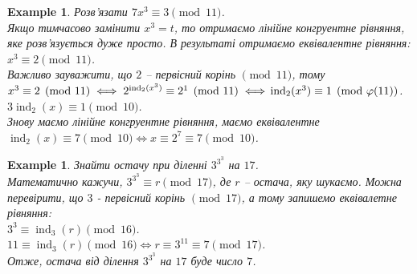 \documentclass[a4paper, 14pt]{extarticle}
\theoremstyle{theoremdd}
\theoremstyle{theoremdd}
\theoremstyle{theoremdd}
\theoremstyle{theoremdd}
\newtheorem{example}[theorem]{Example}
\theoremstyle{theoremdd}
\theoremstyle{theoremdd}
\newtheorem{remark}[theorem]{Remark}
\theoremstyle{theoremdd}
\theoremstyle{theoremdd}
\def\rightproof{$\boxed{\Rightarrow}$ }
\DeclareMathOperator{\ord}{ord}
\DeclareMathOperator{\ind}{ind}
\begin{document}
\iffalse
\begin{remark}
Окремо поясню, що $\ord_{2^{n}} (5) = 2^{n-2} \iff \begin{cases} 2^n \mid 5^{2^{n-2}}-1 \\ 2^{n+1} \nmid 5^{2^{n-2}} - 1 \end{cases}$, бо щось довго з цим мучався.\\
\rightproof Дано: $\ord_{2^n}(5) = 2^{n-2}$, тобто $5^{2^{n-2}} \equiv 1 \pmod {2^n}$. Тоді очевидно маємо перший рядок системи.\\
!Нехай $2^{n+1} \mid 5^{2^{n-2}}-1$, тоді звідси $5^{2^{n-2}} \equiv 1 \pmod {2^{n+1}}$. Тоді звідси $\ord_{2^{n+1}}(5) \mid 2^{n-2}$.\\
Водночас $5^{\ord_{2^{n+1}}(5)} \equiv 1 \pmod {2^n}$, тож звідси $2^{n-2} \mid \ord_{2^{n+1}}(5)$, тобто \\ $\ord_{2^{n+1}}(5) = 2^{n-2}$.
\end{remark}
\fi

\begin{example}
Розв'язати $7x^3 \equiv 3 \pmod {11}$.\\
Якщо тимчасово замінити $x^3 = t$, то отримаємо лінійне конгруентне рівняння, яке розв'язується дуже просто. В результаті отримаємо еквівалентне рівняння:\\
$x^3 \equiv 2 \pmod {11}$.\\
Важливо зауважити, що $2$ -- первісний корінь $\pmod {11}$, тому\\
$x^3 \equiv 2 \pmod {11} \iff 2^{\ind_2 (x^3)} \equiv 2^1 \pmod {11} \iff \\
\ind_2 (x^3) \equiv 1 \pmod {\varphi(11)}$.\\
$3 \ind_2 (x) \equiv 1 \pmod {10}$.\\
Знову маємо лінійне конгруентне рівняння, маємо еквівалентне\\
$\ind_2 (x) \equiv 7 \pmod {10} \iff x \equiv 2^7 \equiv 7 \pmod {10}$.
\end{example}

\begin{example}
Знайти остачу при діленні $3^{3^3}$ на $17$.\\
Математично кажучи, $3^{3^3} \equiv r \pmod {17}$, де $r$ -- остача, яку шукаємо. Можна перевірити, що $3$ - первісний корінь $\pmod {17}$, а тому запишемо еквівалетне рівняння:\\
$3^3 \equiv \ind_3 (r) \pmod {16}$.\\
$11 \equiv \ind_3 (r) \pmod {16} \iff r \equiv 3^{11} \equiv 7 \pmod {17}$.\\
Отже, остача від ділення $3^{3^3}$ на $17$ буде число $7$.
\end{example}
\end{document}
